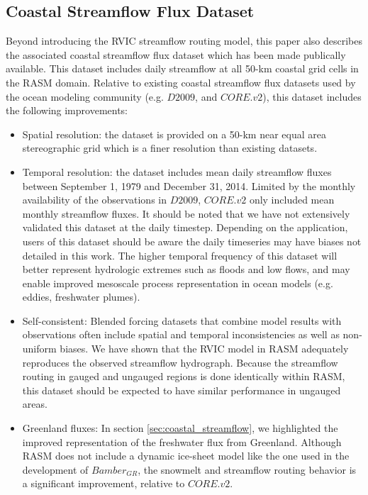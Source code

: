 \documentclass[jgrga, draft]{agutex}
\begin{document}
\begin{article}
\subsection{Coastal Streamflow Flux Dataset}
Beyond introducing the RVIC streamflow routing model, this paper also describes the associated coastal streamflow flux dataset which has been made publically available.
This dataset includes daily streamflow at all 50-km coastal grid cells in the RASM domain.
Relative to existing coastal streamflow flux datasets used by the ocean modeling community (e.g. $D2009$, and $CORE.v2$), this dataset includes the following improvements:

\begin{itemize}[leftmargin=+.5in]
  \item Spatial resolution: the dataset is provided on a 50-km near equal area stereographic grid which is a finer resolution than existing datasets.
  \item Temporal resolution: the dataset includes mean daily streamflow fluxes between September 1, 1979 and December 31, 2014.
  Limited by the monthly availability of the observations in $D2009$, $CORE.v2$ only included mean monthly streamflow fluxes.
  It should be noted that we have not extensively validated this dataset at the daily timestep. Depending on the application, users of this dataset should be aware the daily timeseries may have biases not detailed in this work.
  The higher temporal frequency of this dataset will better represent hydrologic extremes such as floods and low flows, and may enable improved mesoscale process representation in ocean models (e.g. eddies, freshwater plumes).
  \item Self-consistent: Blended forcing datasets that combine model results with observations often include spatial and temporal inconsistencies as well as non-uniform biases. We have shown that the RVIC model in RASM adequately reproduces the observed streamflow hydrograph. Because the streamflow routing in gauged and ungauged regions is done identically within RASM, this dataset should be expected to have similar performance in ungauged areas.
  \item Greenland fluxes: In section \ref{sec:coastal_streamflow}, we highlighted the improved representation of the freshwater flux from Greenland. Although RASM does not include a dynamic ice-sheet model like the one used in the development of $Bamber_{GR}$, the snowmelt and streamflow routing behavior is a significant improvement, relative to $CORE.v2$.
\end{itemize}


\end{article}
\end{document}
